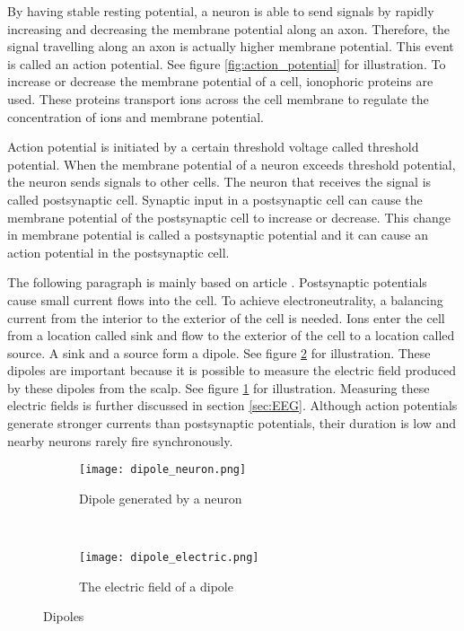 By having stable resting potential, a neuron is able to send signals by rapidly increasing and decreasing the membrane potential along an axon. Therefore, the signal travelling along an axon is actually higher membrane potential. This event is called an action potential. See figure \ref{fig:action_potential} for illustration. To increase or decrease the membrane potential of a cell, ionophoric proteins are used. These proteins transport ions across the cell membrane to regulate the concentration of ions and membrane potential.

Action potential is initiated by a certain threshold voltage called threshold potential. When the membrane potential of a neuron exceeds threshold potential, the neuron sends signals to other cells. The neuron that receives the signal is called postsynaptic cell. Synaptic input in a postsynaptic cell can cause the membrane potential of the postsynaptic cell to increase or decrease. This change in membrane potential is called a postsynaptic potential and it can cause an action potential in the postsynaptic cell.

The following paragraph is mainly based on article \cite{electric_field}. Postsynaptic potentials cause small current flows into the cell. To achieve electroneutrality, a balancing current from the interior to the exterior of the cell is needed. Ions enter the cell from a location called sink and flow to the exterior of the cell to a location called source. A sink and a source form a dipole. See figure \ref{fig:dipole_electric} for illustration. These dipoles are important because it is possible to measure the electric field produced by these dipoles from the scalp. See figure \ref{fig:dipole_neuron} for illustration. Measuring these electric fields is further discussed in section \ref{sec:EEG}. Although action potentials generate stronger currents than postsynaptic potentials, their duration is low and nearby neurons rarely fire synchronously.

\begin{figure}[h!]
	\centering
	\begin{subfigure}{0.48\textwidth}
		\texttt{[image: dipole\_neuron.png]}
		\caption{Dipole generated by a neuron \cite[p.~669]{neuroscience}}
		\label{fig:dipole_neuron}
	\end{subfigure}
	~
	\begin{subfigure}{0.48\textwidth}
		\texttt{[image: dipole\_electric.png]}
		\caption{The electric field of a dipole\protect\footnotemark}
		\label{fig:dipole_electric}
	\end{subfigure}
	\caption{Dipoles}
	\label{fig:dipole}
\end{figure}

